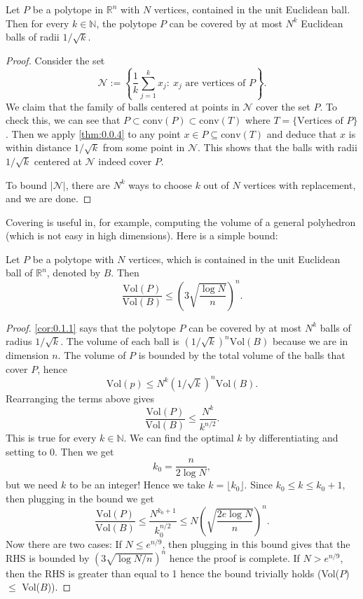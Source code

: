 \begin{corollary}
\label{cor:0.1.1}
Let $P$ be a polytope in $\mathbb{R}^n$ with $N$ vertices, contained in the unit Euclidean ball. Then 
for every $k \in \mathbb{N}$, the polytope $P$ can be covered by at most $N^k$ Euclidean balls of radii $
1 / \sqrt{k}$.
\end{corollary}

\begin{proof}
Consider the set 
\[ \mathcal{N} := \left\{ \frac{1}{k}\sum_{j = 1}^{k} x_j: \ x_j 
\text{ are vertices of } P \right\}. \]
We claim that the family of balls centered at points in $\mathcal{N}$ cover the set $P$. To check this, we 
can see that $P \subset \text{conv}(P) \subset \text{conv}(T)$ where $T = \{\text{Vertices of } P\}$. 
Then we apply \cref{thm:0.0.4} to any point $x \in P \subseteq \text{conv}(T)$ and deduce that $x$ is within 
distance $1/\sqrt{k}$ from some point in $\mathcal{N}$. This shows that the balls with radii $1/\sqrt{k}$ 
centered at $\mathcal{N}$ indeed cover $P$. 

To bound $|\mathcal{N}|$, there are $N^k$ ways to choose $k$ out of $N$ vertices with replacement, and 
we are done.	
\end{proof}

Covering is useful in, for example, computing the volume of a general polyhedron (which is not easy in 
high dimensions). Here is a simple bound: 
\begin{theorem}[]
\label{thm:0.1.2}
Let $P$ be a polytope with $N$ vertices, which is contained in the unit Euclidean ball of $\mathbb{R}^n$, 
denoted by $B$. Then 
\[ \frac{\text{Vol}(P)}{\text{Vol}(B)} \leq \left( 3 \sqrt{\frac{\log{N}}{n}} \right)^n. \]
\end{theorem}

\begin{proof}
\cref{cor:0.1.1} says that the polytope $P$ can be covered by at most $N^k$ balls of radius $1/\sqrt{k}$. 
The volume of each ball is $(1/\sqrt{k})^{n} \text{Vol}(B)$ because we are in dimension $n$. The volume of 
$P$ is bounded by the total volume of the balls that cover $P$, hence 
\[ \text{Vol}(p) \leq N^k (1 / \sqrt{k})^n \text{Vol}(B). \]
Rearranging the terms above gives 
\[ \frac{\text{Vol}(P)}{\text{Vol}(B)} \leq \frac{N^k}{k^{n/2}}. \]
This is true for every $k \in \mathbb{N}$. We can find the optimal $k$ by differentiating and setting 
to 0. Then we get 
\[ k_0 = \frac{n}{2 \log{N}}, \]
but we need $k$ to be an integer! Hence we take $k = \lfloor k_0 \rfloor$. Since $k_0 \leq k \leq k_0 + 1$, 
then plugging in the bound we get 
\[ \frac{\text{Vol}(P)}{\text{Vol}(B)} \leq \frac{N^{k_0 + 1}}{k_0^{n / 2}} 
\leq N \left( \sqrt{\frac{2e \log{N}}{n}} \right)^n. \]
Now there are two cases: If $N \leq e^{n / 9}$, then plugging in this bound gives that the RHS is bounded 
by $(3 \sqrt{\log{N} / n})^n$ hence the proof is complete. If $N > e^{n / 9}$, then the RHS is greater than 
equal to 1 hence the bound trivially holds (Vol($P$) $\leq$ Vol($B$)).
\end{proof}

